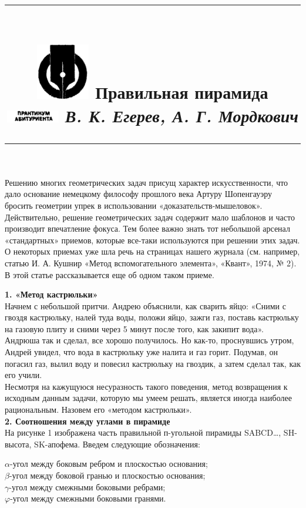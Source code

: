 \documentclass[12pt,a4paper,twocolumn,twoside]{article}
\title{\vspace*{-3cm}
\noindent\rule{16cm}{0.4pt}\\\vspace*{0.7cm}
\indent\includegraphics{l1}\hspace*{1cm}
\indent\Huge\textbf{ Правильная пирамида}\\
\includegraphics{l2}\hspace*{1.3cm}
\indent\normalsize\textit{В. К. Егерев, А. Г. Мордкович \hspace*{3.6cm} }\\
\date{}\vspace*{0.3cm}
\noindent\rule{16cm}{0.4pt}\vspace*{-2.3cm}}
\begin{document}
\maketitle
\noindent Решению многих геометрических задач присущ характер искусственности, что дало основание немецкому философу прошлого века Артуру Шопенгауэру бросить геометрии упрек в использовании «доказательств-мышеловок». Действительно, решение геометрических задач содержит мало шаблонов и часто производит впечатление фокуса. Тем более важно знать тот небольшой арсенал «стандартных» приемов, которые все-таки используются при решении этих задач. О некоторых приемах уже шла речь на страницах нашего журнала (см. например, статью И. А. Кушнир «Метод вспомогательного элемента», «Квант», 1974, № 2). В этой статье рассказывается еще об одном таком приеме.\\
\newline

\noindent\textbf{1. «Метод кастрюльки»}\\
Начнем с небольшой притчи. Андрею объяснили, как сварить яйцо: «Сними с гвоздя кастрюльку, налей туда воды, положи яйцо, зажги газ, поставь кастрюльку на газовую плиту и сними через 5 минут после того, как закипит вода». Андрюша так и сделал, все хорошо получилось. Но как-то, проснувшись утром, Андрей увидел, что вода в кастрюльку уже налита и газ горит. Подумав, он погасил газ, вылил воду и повесил кастрюльку на гвоздик, а затем сделал так, как его учили.\\
\indent Несмотря на кажущуюся несуразность такого поведения, метод возвращения к исходным данным задачи, которую мы умеем решать, является иногда наиболее рациональным. Назовем его «методом кастрюльки».\\

\noindent\textbf{2. Соотношения между углами в пирамиде}\\
На рисунке 1 изображена часть правильной п-угольной пирамиды SABCD…, SH-высота, SK-апофема. Введем следующие обозначения:

\leftskip=0.5cm\vspace*{-0.5cm}
\noindent$\alpha$-угол между боковым ребром и плоскостью основания;\\
$\beta$-угол между боковой гранью и плоскостью основания;\\
$\gamma$-угол между смежными боковыми ребрами;\\
$\varphi$-угол между смежными боковыми гранями.
\end{document}
